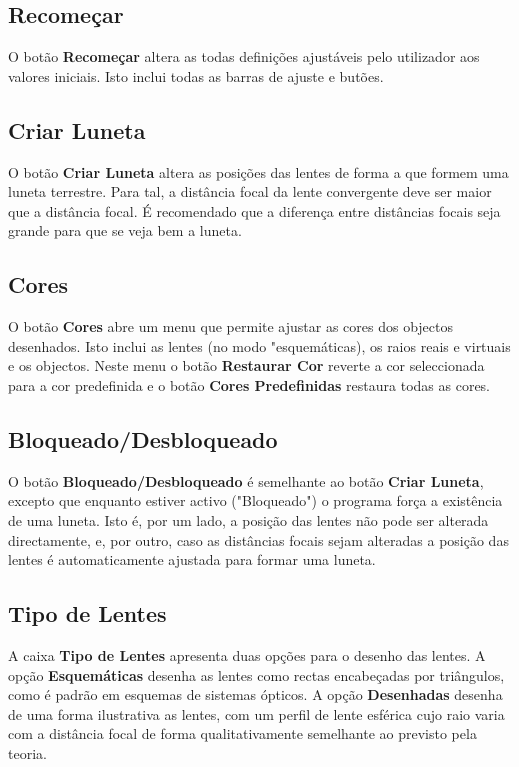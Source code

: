 \documentclass[a4paper,12pt]{article}
\begin{document}
\subsection{Recomeçar}
O botão {\bf Recomeçar} altera as todas definições ajustáveis pelo utilizador aos valores iniciais. Isto inclui todas as barras de ajuste e butões.
\par
\subsection{Criar Luneta}
O botão {\bf Criar Luneta} altera as posições das lentes de forma a que formem uma luneta terrestre. Para tal, a distância focal da lente convergente deve ser maior que a distância focal. É recomendado que a diferença entre distâncias focais seja grande para que se veja bem a luneta.
\par
\subsection{Cores}
O botão {\bf Cores} abre um menu que permite ajustar as cores dos objectos desenhados. Isto  inclui as lentes (no modo "esquemáticas), os raios reais e virtuais e os objectos. Neste menu o botão {\bf Restaurar Cor} reverte a cor seleccionada para a cor predefinida e o botão {\bf Cores Predefinidas} restaura todas as cores.
\par
\par
\subsection{Bloqueado/Desbloqueado}
O botão {\bf Bloqueado/Desbloqueado} é semelhante ao botão {\bf Criar Luneta}, excepto que enquanto estiver activo ("Bloqueado") o programa força a existência de uma luneta. Isto é, por um lado, a posição das lentes não pode ser alterada directamente, e, por outro, caso as distâncias focais sejam alteradas a posição das lentes é automaticamente ajustada para formar uma luneta.
\subsection{Tipo de Lentes} 
A caixa {\bf Tipo de Lentes} apresenta duas opções para o desenho das lentes. A opção {\bf Esquemáticas} desenha as lentes como rectas encabeçadas por triângulos, como é padrão em esquemas de sistemas ópticos. A opção {\bf Desenhadas} desenha de uma forma ilustrativa as lentes, com um perfil de lente esférica cujo raio varia com a distância focal de forma qualitativamente semelhante ao previsto pela teoria.

\par
\end{document}
